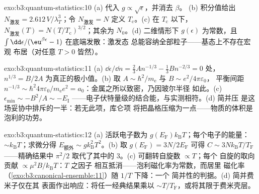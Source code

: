\begin{solution}{exo:b3:quantum-statistics:10}
(a) 代入 $g \propto \sqrt\epsilon$，并消去 $\beta$。
(b) 积分值给出 $N_{\text{激发}} =
2.612\,V/\lambda_T^3$；令 $N_{\text{激发}} = N$ 定义
$T_{\text{c}}$。(c) 在 $T_{\text{c}}$ 以下，$N_{\text{激发}}(T) =
N(T/T_{\text{c}})^{3/2}$；其余为 $N_0$。(d) 二维情形下
$g(\epsilon)$ 为常数，且 $\int\dd\epsilon/(\eu^{
\beta\epsilon} - 1)$ 在底端发散：激发态
总能容纳全部粒子——基态上不存在宏观
布居（对任意 $T > 0$ 皆然）。
\end{solution}

\begin{solution}{exo:b3:quantum-statistics:11}
(a) $\dd\epsilon/\dd n = \tfrac23 An^{-1/3} - \tfrac13 Bn^{-2/3} =
0$ 处，$n^{1/3} = B/2A$ 为真正的极小值。(b) 取 $A \sim
\hbar^2/m_{\text{e}}$ 与 $B \sim e^2/4\pi\varepsilon_0$，
平衡间距 $n^{-1/3} \sim \hbar^2 4\pi\varepsilon_0/
m_{\text{e}}e^2 = a_0$：金属之所以致密，乃因玻尔半径
如此。(c) $\epsilon_{\min} \sim -B^2/A \sim -E_{\text{I}}$
——电子伏特量级的结合能，与实测相符。(d) 简并压
是这场妥协中排斥的一半：若无此项，库仑项
将把晶格压缩为一点——物质的体积是泡利的功劳。
\end{solution}

\begin{solution}{exo:b3:quantum-statistics:12}
(a) 活跃电子数为 $g(E_{\text{F}})k_{\text{B}}T$；每个电子的能量：
$\sim k_{\text{B}}T$；求微分得 $E_{\text{额外}} \sim
g k_{\text{B}}^2T^2$。(b) 取 $g(E_{\text{F}}) = 3N/2E_{\text{F}}$
可得 $C \sim 3Nk_{\text{B}}T/T_{\text{F}}$——精确结果中
$\pi^2/2$ 取代了其中的 3。(c) 可翻转自旋数 $\propto T$；每个
自旋的取向贡献 $\propto \mu^2B/k_{\text{B}}T$：$T$ 之因子
相互抵消——泡利磁化率为常数，而居里
磁化率（\cref{exo:b3:canonical-ensemble:11}）随 $1/T$ 下降：一个
简并性的判据。(d) 简并费米子仅在其
表面作出响应：将任一经典结果乘以 $\sim
T/T_{\text{F}}$，或将其限于费米壳层。
\end{solution}

